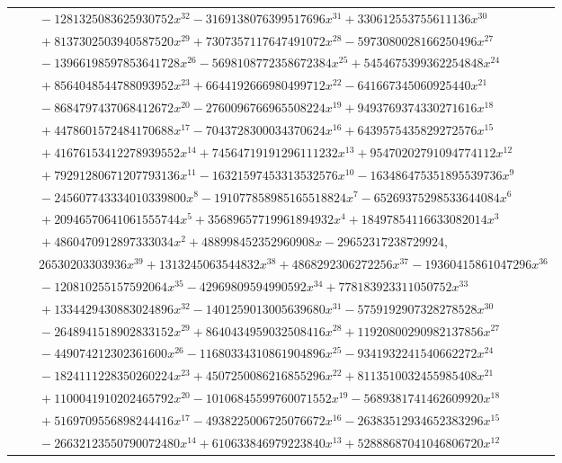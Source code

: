 \documentclass[11pt]{article}
\begin{document}
\begin{longtable}{@{}ll@{}}
 & $\quad -1281325083625930752x^{32}-3169138076399517696x^{31}+330612553755611136x^{30}$\\
 & $\quad +8137302503940587520x^{29}+7307357117647491072x^{28}-5973080028166250496x^{27}$\\
 & $\quad -13966198597853641728x^{26}-5698108772358672384x^{25}+5454675399362254848x^{24}$\\
 & $\quad +8564048544788093952x^{23}+6644192666980499712x^{22}-641667345060925440x^{21}$\\
 & $\quad -8684797437068412672x^{20}-2760096766965508224x^{19}+9493769374330271616x^{18}$\\
 & $\quad +4478601572484170688x^{17}-7043728300034370624x^{16}+6439575435829272576x^{15}$\\
 & $\quad +41676153412278939552x^{14}+74564719191296111232x^{13}+95470202791094774112x^{12}$\\
 & $\quad +79291280671207793136x^{11}-16321597453313532576x^{10}-163486475351895539736x^{9}$\\
 & $\quad -245607743334010339800x^{8}-191077858985165518824x^{7}-65269375298533644084x^{6}$\\
 & $\quad +20946570641061555744x^{5}+35689657719961894932x^{4}+18497854116633082014x^{3}$\\
 & $\quad +4860470912897333034x^{2}+488998452352960908x-29652317238729924,$\\
 & $\quad 26530203303936x^{39}+1313245063544832x^{38}+4868292306272256x^{37}-19360415861047296x^{36}$\\
 & $\quad -120810255157592064x^{35}-42969809594990592x^{34}+778183923311050752x^{33}$\\
 & $\quad +1334429430883024896x^{32}-1401259013005639680x^{31}-5759192907328278528x^{30}$\\
 & $\quad -2648941518902833152x^{29}+8640434959032508416x^{28}+11920800290982137856x^{27}$\\
 & $\quad -449074212302361600x^{26}-11680334310861904896x^{25}-9341932241540662272x^{24}$\\
 & $\quad -1824111228350260224x^{23}+4507250086216855296x^{22}+8113510032455985408x^{21}$\\
 & $\quad +1100041910202465792x^{20}-10106845599760071552x^{19}-5689381741462609920x^{18}$\\
 & $\quad +5169709556898244416x^{17}-4938225006725076672x^{16}-26383512934652383296x^{15}$\\
 & $\quad -26632123550790072480x^{14}+610633846979223840x^{13}+52888687041046806720x^{12}$\\

\end{longtable}
\end{document}
